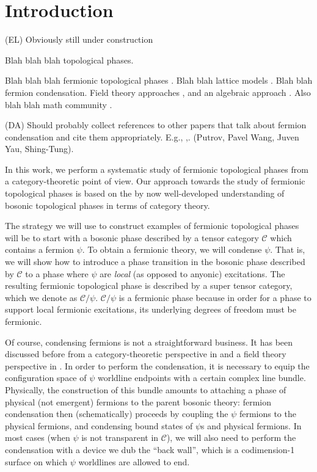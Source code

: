 \documentclass[12pt,a4paper]{article}
\newcommand{\mcc}{\mathcal{C}}
\newcommand{\dave}[1]{{\color{ao(english)}\footnotesize{(DA) #1}}}
\newcommand{\ethan}[1]{{\color{amethyst}\footnotesize{(EL) #1}}}
\begin{document}
\section{Introduction}

\ethan{Obviously still under construction} 

Blah blah blah topological phases. 

Blah blah blah fermionic topological phases \cite{gu2015,gu2014}. 
Blah blah lattice models \cite{ware2016,tarantino2016}.
Blah blah fermion condensation. 
Field theory approaches \cite{gaiotto2016, bhardwaj2016, kapustin2017}, 
and an algebraic approach \cite{wan2016}. 
Also blah blah math community \cite{usher2016,brundan2016}.

\dave{Should probably collect references to other papers that talk about fermion condensation and cite them appropriately. E.g., \cite{wan2016},\cite{bhardwaj2016b}.
{(Putrov, Pavel
Wang, Juven
Yau, Shing-Tung)}.
}

In this work, we perform a systematic study of fermionic topological phases from a category-theoretic
point of view. 
Our approach towards the study of fermionic topological phases is based on 
the by now well-developed understanding of bosonic topological phases in terms of category theory. 

The strategy we will use to construct examples of fermionic topological phases will be to start with 
a bosonic phase described by a tensor category $\mcc$
which contains a fermion $\psi$.
To obtain a fermionic theory, we will condense $\psi$.
That is, we will show how to introduce a phase transition in the bosonic phase 
described by $\mcc$ to a phase where $\psi$ are {\it local} (as opposed to anyonic) excitations.
The resulting fermionic topological phase is described by a super tensor category, which we denote
as $\mcc / \psi$.
$\mcc/\psi$ is a fermionic phase because in order for a phase to support local fermionic excitations, 
its underlying degrees of freedom must be fermionic. 

Of course, condensing fermions is not a straightforward business. 
It has been discussed before from a category-theoretic perspective in \cite{wan2016}
and a field theory perspective in \cite{bhardwaj2016, kapustin2017,bhardwaj2016b}.
In order to perform the condensation, it is necessary to equip the configuration 
space of $\psi$ worldline endpoints with a certain complex line bundle. 
Physically, the construction of this bundle amounts to attaching a phase of physical (not emergent) fermions 
to the parent bosonic theory: 
fermion condensation then (schematically) proceeds by coupling the $\psi$ fermions to 
the physical fermions, and condensing bound states of $\psi$s and physical fermions. 
In most cases (when $\psi$ is not transparent in $\mcc$), we will also need to perform 
the condensation with a device we dub the ``back wall'', which is a codimension-1 surface 
on which $\psi$ worldlines are allowed to end. 
\end{document}
